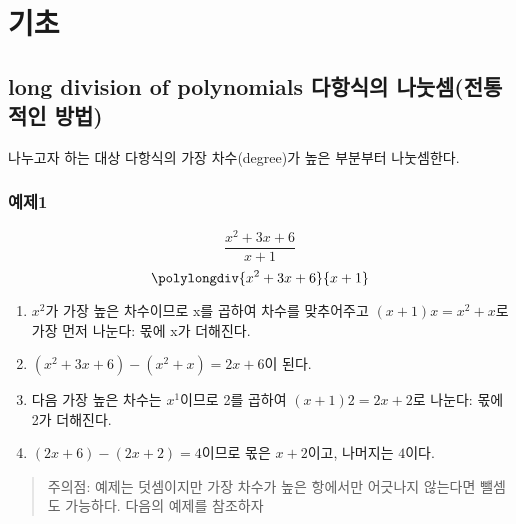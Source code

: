 \documentclass{article}
\begin{document}
\section {기초}

\subsection {long division of polynomials 다항식의 나눗셈(전통적인 방법)}
나누고자 하는 대상 다항식의 가장 차수(degree)가 높은 부분부터 나눗셈한다.
\subsubsection{예제1}
$$\frac{x^{2}+3x+6}{x+1}$$
$$\polylongdiv{x^{2}+3x+6}{x+1}$$
\begin {enumerate}
\item $x^{2}$가 가장 높은 차수이므로 x를 곱하여 차수를 맞추어주고 $(x+1)x = x^{2}+x$로 가장 먼저 나눈다: 몫에 x가 더해진다.
\item $(x^{2}+3x+6)-(x^{2}+x)=2x+6$이 된다.
\item 다음 가장 높은 차수는 $x^{1}$이므로 2를 곱하여 $(x+1)2 = 2x+2$로 나눈다: 몫에 2가 더해진다.
\item $(2x+6)-(2x+2) = 4$이므로 몫은 $x+2$이고, 나머지는 $4$이다.
\end {enumerate}
\begin{quote}
주의점: 예제는 덧셈이지만 가장 차수가 높은 항에서만 어긋나지 않는다면 뺄셈도 가능하다. 다음의 예제를 참조하자
\end{quote}
\end{document}
